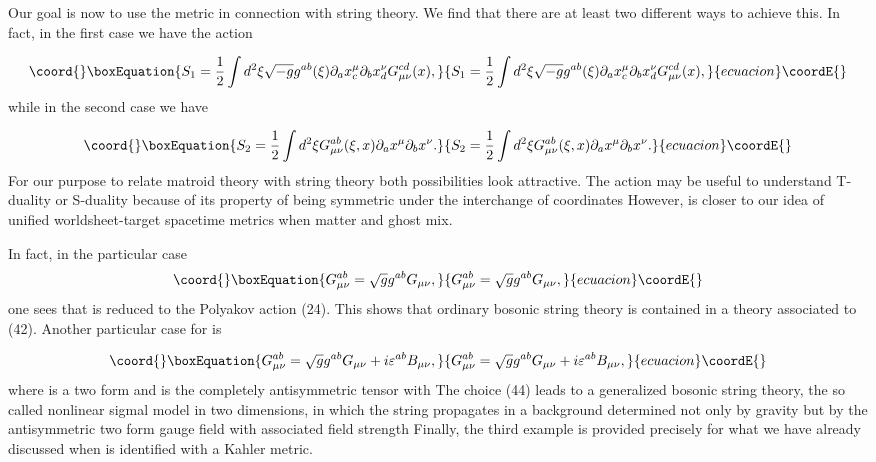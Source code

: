 \documentclass[a4paper,12pt]{article}
\begin{document}
Our goal is now to use the metric \coordHE{} in
connection with string theory. We find that there are at least two different
ways to achieve this. In fact, in the first case we have the action

\begin{equation}\coord{}\boxEquation{
S_{1}=\frac{1}{2}\int d^{2}\xi \sqrt{-g}g^{ab}(\xi )\partial _{a}x_{c}^{\mu
}\partial _{b}x_{d}^{\nu }G_{\mu \nu }^{cd}(x),  \label{41}
}{
S_{1}=\frac{1}{2}\int d^{2}\xi \sqrt{-g}g^{ab}(\xi )\partial _{a}x_{c}^{\mu
}\partial _{b}x_{d}^{\nu }G_{\mu \nu }^{cd}(x),  }{ecuacion}\coordE{}\end{equation}
while in the second case we have\coordHE{}

\begin{equation}\coord{}\boxEquation{
S_{2}=\frac{1}{2}\int d^{2}\xi G_{\mu \nu }^{ab}(\xi ,x)\partial _{a}x^{\mu
}\partial _{b}x^{\nu }.  \label{42}
}{
S_{2}=\frac{1}{2}\int d^{2}\xi G_{\mu \nu }^{ab}(\xi ,x)\partial _{a}x^{\mu
}\partial _{b}x^{\nu }.  }{ecuacion}\coordE{}\end{equation}
For our purpose to relate matroid theory with string theory both
possibilities look attractive. The action \coordHE{} may be useful to
understand T-duality or S-duality because of its property of being symmetric
under the interchange of coordinates \coordHE{} However, \coordHE{}
is closer to our idea of unified worldsheet-target spacetime metrics when
matter and ghost mix.

In fact, in the particular case 
\begin{equation}\coord{}\boxEquation{
G_{\mu \nu }^{ab}=\sqrt{g}g^{ab}G_{\mu \nu },  \label{43}
}{
G_{\mu \nu }^{ab}=\sqrt{g}g^{ab}G_{\mu \nu },  }{ecuacion}\coordE{}\end{equation}
one sees that \coordHE{} is reduced to the Polyakov action (24). This shows
that ordinary bosonic string theory is contained in a theory associated to
(42). Another particular case for \coordHE{} is

\begin{equation}\coord{}\boxEquation{
G_{\mu \nu }^{ab}=\sqrt{g}g^{ab}G_{\mu \nu }+i\varepsilon ^{ab}B_{\mu \nu },
\label{44}
}{
G_{\mu \nu }^{ab}=\sqrt{g}g^{ab}G_{\mu \nu }+i\varepsilon ^{ab}B_{\mu \nu },
}{ecuacion}\coordE{}\end{equation}
where \coordHE{} is a two form and \coordHE{} is
the completely antisymmetric tensor with \coordHE{} The choice
(44) leads to a generalized bosonic string theory, the so called nonlinear
sigmal model in two dimensions, in which the string propagates in a
background determined not only by gravity but by the antisymmetric two form
gauge field \coordHE{} with associated field strength \coordHE{} Finally, the third
example is provided precisely for what we have already discussed when \coordHE{} is identified with a Kahler metric.
\end{document}
